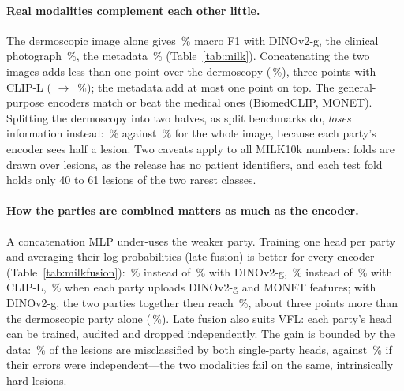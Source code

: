 \paragraph{Real modalities complement each other little.}
The dermoscopic image alone gives \milkGDerm\,\% macro F1 with DINOv2-g, the clinical photograph \milkGClin\,\%, the metadata \milkMeta\,\% (Table~\ref{tab:milk}). Concatenating the two images adds less than one point over the dermoscopy (\milkGBoth\,\%), three points with CLIP-L (\milkCDerm{} $\to$ \milkCBoth\,\%); the metadata add at most one point on top. The general-purpose encoders match or beat the medical ones (BiomedCLIP, MONET). Splitting the dermoscopy into two halves, as split benchmarks do, \emph{loses} information instead: \milkGHalves\,\% against \milkGDerm\,\% for the whole image, because each party's encoder sees half a lesion. Two caveats apply to all MILK10k numbers: folds are drawn over lesions, as the release has no patient identifiers, and each test fold holds only 40 to 61 lesions of the two rarest classes.

\paragraph{How the parties are combined matters as much as the encoder.}
A concatenation MLP under-uses the weaker party. Training one head per party and averaging their log-probabilities (late fusion) is better for every encoder (Table~\ref{tab:milkfusion}): \mfGLate\,\% instead of \mfGCat\,\% with DINOv2-g, \mfCLate\,\% instead of \mfCCat\,\% with CLIP-L, \mfGMLate\,\% when each party uploads DINOv2-g and MONET features; with DINOv2-g, the two parties together then reach \mfGLate\,\%, about three points more than the dermoscopic party alone (\milkGDerm\,\%). Late fusion also suits VFL: each party's head can be trained, audited and dropped independently. The gain is bounded by the data: \mfGBoth\,\% of the lesions are misclassified by both single-party heads, against \mfGIndep\,\% if their errors were independent---the two modalities fail on the same, intrinsically hard lesions.

